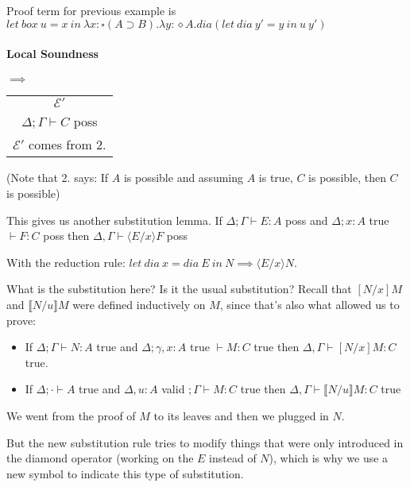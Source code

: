 \documentclass[12 pt]{article}
\begin{document}
      Proof term for previous example is $let\ box\ u = x\ in \
      \lambda x:\square(A \supset B).\lambda y: \diamond A. dia(let\
      dia\ y' = y\ in\ u\ y')$
      \paragraph{Local Soundness}
      \begin{center}
        \noLine
        \noLine
        \DP
        $\implies$
        \begin{tabular}{c}
          $\mathcal{E}'$
          \\ $\Delta; \Gamma \vdash C$ poss
          \\ $\mathcal{E}'$ comes from 2.
        \end{tabular}
      \end{center}
      (Note that 2. says: If $A$ is possible and assuming $A$ is true,
      $C$ is possible, then $C$ is possible)

      This gives us another substitution lemma. If $\Delta; \Gamma
      \vdash E : A$ poss and $\Delta; x:A$ true $\vdash F : C$ poss then
      $\Delta, \Gamma \vdash \langle E/x \rangle F$ poss

      With the reduction rule: $let\ dia\ x = dia\ E\ in\ N \implies
      \langle E/x\rangle N$.

      What is the substitution here? Is it the usual substitution?
      Recall that $[N/x] M$ and $\llbracket N/u \rrbracket M$ were
      defined inductively on $M$, since that's also what allowed us to
      prove:
      \begin{itemize}
      \item  If $\Delta; \Gamma \vdash N : A$ true and $\Delta; \gamma, x
        : A $ true $\vdash M : C$ true then $\Delta, \Gamma \vdash [N/x]
        M:C$ true.
      \item If $\Delta; \cdot \vdash A$ true and $\Delta, u : A$ valid
        $;\Gamma \vdash M : C$ true then $\Delta, \Gamma \vdash
        \llbracket N/u \rrbracket M : C$ true
      \end{itemize}
      We went from the proof of $M$ to its leaves and then we plugged
      in $N$.

      But the new substitution rule tries to modify things that were
      only introduced in the diamond operator (working on the $E$
      instead of $N$), which is why we use a new symbol to indicate
      this type of substitution.
\end{document}
